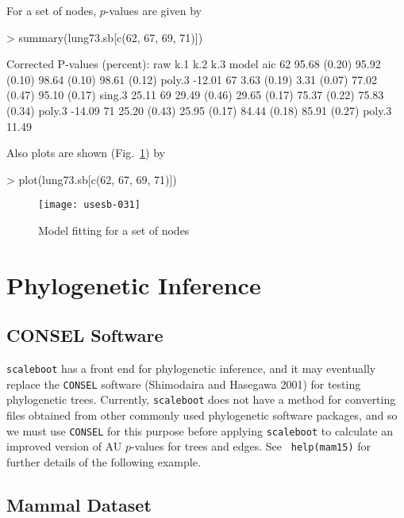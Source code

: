 \documentclass[a4paper]{amsart}
\begin{document}
For a set of nodes, $p$-values are given by
\begin{Schunk}
\begin{Sinput}
> summary(lung73.sb[c(62, 67, 69, 71)])
\end{Sinput}
\begin{Soutput}
Corrected P-values (percent):
   raw          k.1          k.2          k.3          model  aic    
62 95.68 (0.20) 95.92 (0.10) 98.64 (0.10) 98.61 (0.12) poly.3 -12.01 
67  3.63 (0.19)  3.31 (0.07) 77.02 (0.47) 95.10 (0.17) sing.3  25.11 
69 29.49 (0.46) 29.65 (0.17) 75.37 (0.22) 75.83 (0.34) poly.3 -14.09 
71 25.20 (0.43) 25.95 (0.17) 84.44 (0.18) 85.91 (0.27) poly.3  11.49 
\end{Soutput}
\end{Schunk}
Also plots are shown (Fig.~\ref{fig:lung73nodes}) by
\begin{Schunk}
\begin{Sinput}
> plot(lung73.sb[c(62, 67, 69, 71)])
\end{Sinput}
\end{Schunk}
\begin{figure}
\begin{center}
\texttt{[image: usesb-031]}
\caption{Model fitting for a set of nodes} \label{fig:lung73nodes}
\end{center}
\end{figure}

\section{Phylogenetic Inference}

\subsection{CONSEL Software}

{\tt scaleboot} has a front end for phylogenetic inference, and it may
eventually replace the {\tt CONSEL} software (Shimodaira and Hasegawa
2001) for testing phylogenetic trees. Currently, {\tt scaleboot} does
not have a method for converting files obtained from other commonly
used phylogenetic software packages, and so we must use {\tt CONSEL}
for this purpose before applying {\tt scaleboot} to calculate an
improved version of AU $p$-values for trees and edges.  See {\tt
help(mam15)} for further details of the following example.

\subsection{Mammal Dataset}
\end{document}
